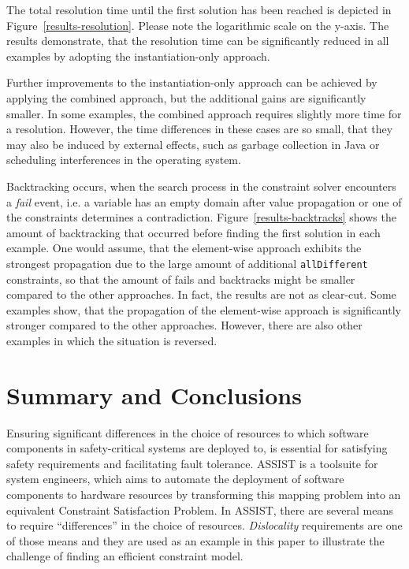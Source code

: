 \documentclass[conference]{IEEEtran}
\begin{document}
The total resolution time until the first solution has been reached is depicted in Figure~\ref{results-resolution}.
Please note the logarithmic scale on the y-axis.
The results demonstrate, that the resolution time can be significantly reduced in all examples by adopting the instantiation-only approach.

Further improvements to the instantiation-only approach can be achieved by applying the combined approach, but the additional gains are significantly smaller.
In some examples, the combined approach requires slightly more time for a resolution.
However, the time differences in these cases are so small, that they may also be induced by external effects, such as garbage collection in Java or scheduling interferences in the operating system.

Backtracking occurs, when the search process in the constraint solver encounters a \emph{fail} event, i.e. a variable has an empty domain after value propagation or one of the constraints determines a contradiction.
Figure~\ref{results-backtracks} shows the amount of backtracking that occurred before finding the first solution in each example.
One would assume, that the element-wise approach exhibits the strongest propagation due to the large amount of additional \texttt{allDifferent} constraints, so that the amount of fails and backtracks might be smaller compared to the other approaches.
In fact, the results are not as clear-cut.
Some examples show, that the propagation of the element-wise approach is significantly stronger compared to the other approaches.
However, there are also other examples in which the situation is reversed.

\section{Summary and Conclusions}

Ensuring significant differences in the choice of resources to which software components in safety-critical systems are deployed to, is essential for satisfying safety requirements and facilitating fault tolerance.
ASSIST is a toolsuite for system engineers, which aims to automate the deployment of software components to hardware resources by transforming this mapping problem into an equivalent Constraint Satisfaction Problem.
In ASSIST, there are several means to require ``differences'' in the choice of resources.
\emph{Dislocality} requirements are one of those means and they are used as an example in this paper to illustrate the challenge of finding an efficient constraint model.
\end{document}
